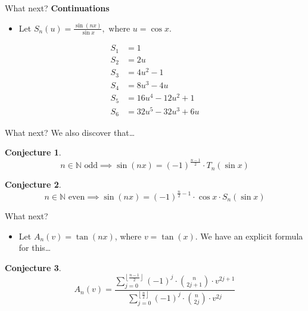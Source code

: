 \documentclass{beamer}
\newtheorem{conjecture}{Conjecture}
\begin{document}
\begin{frame}{What next?}
 \vspace{-18pt}
 \textbf{Continuations}
 \begin{itemize}
  \item Let $S_{n}(u)=\frac{\sin(nx)}{\sin{x}},\text{ where } u = \cos x$.
 \end{itemize}
 \begin{align*}
  S_{1} & = 1                      \\
  S_{2} & = 2u                     \\
  S_{3} & = 4u^{2} -1              \\
  S_{4} & = 8u^{3} - 4u            \\
  S_{5} & = 16u^{4} - 12u^{2} + 1  \\
  S_{6} & = 32u^{5} - 32u^{3} + 6u
 \end{align*}
\end{frame}

\begin{frame}{What next?}
 We also discover that\dots
 \begin{conjecture}
  \vspace{-12pt}
  \[n\in\mathbb{N} \text{ odd} \implies \sin(nx) = (-1)^{\frac{n-1}{2}}\cdot  T_{n}(\sin x)\]
 \end{conjecture}
 \begin{conjecture}
  \vspace{-12pt}
  \[n\in\mathbb{N} \text{ even} \implies \sin(nx) = (-1)^{\frac{n}{2}-1} \cdot \cos x \cdot S_{n}(\sin x)\]
 \end{conjecture}
\end{frame}

\begin{frame}{What next?}
\begin{itemize}
    \item Let $A_n(v)=\tan(nx)$, where $v=\tan(x)$. We have an explicit formula for this\dots
\end{itemize}
 \begin{conjecture}
  \vspace{-12pt}
  \[A_n(v) = \dfrac{\displaystyle\sum_{j=0}^{\left\lfloor \frac{n-1}{2} \right\rfloor} (-1)^j \cdot \binom{n}{2j + 1}\cdot v^{2j + 1}}{\displaystyle\sum_{j=0}^{\left\lfloor \frac{n}{2} \right\rfloor} (-1)^j \cdot \binom{n}{2j}\cdot v^{2j}}\]
 \end{conjecture}
\end{frame}
\end{document}
